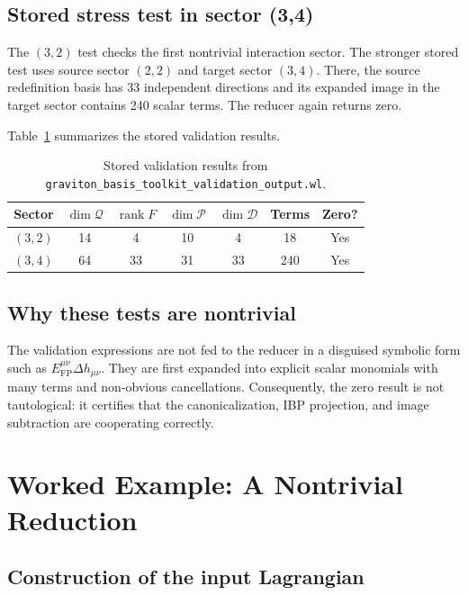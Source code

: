 \documentclass[11pt]{report}
\numberwithin{equation}{chapter}
\newcommand{\validationdata}{\texttt{graviton\_basis\_toolkit\_validation\_output.wl}}
\newcommand{\Rank}{\operatorname{rank}}
\begin{document}
\section{Stored stress test in sector (3,4)}

The \((3,2)\) test checks the first nontrivial interaction sector.
The stronger stored test uses source sector \((2,2)\) and target sector \((3,4)\).
There, the source redefinition basis has 33 independent directions and its expanded image in the target sector contains 240 scalar terms.
The reducer again returns zero.

Table~\ref{tab:validation} summarizes the stored validation results.

\begin{table}[tbp]
\centering
\caption{Stored validation results from \validationdata.}
\label{tab:validation}
{\small
\begin{tabular}{@{}ccccccc@{}}
\toprule
Sector & \(\dim \mathcal{Q}\) & \(\Rank F\) & \(\dim \mathcal{P}\) & \(\dim \mathcal{D}\) & Terms & Zero? \\
\midrule
\((3,2)\) & 14 & 4  & 10 & 4  & 18  & Yes \\
\((3,4)\) & 64 & 33 & 31 & 33 & 240 & Yes \\
\bottomrule
\end{tabular}
}
\end{table}

\section{Why these tests are nontrivial}

The validation expressions are not fed to the reducer in a disguised symbolic form such as \(E_{\mathrm{FP}}^{\mu\nu}\Delta h_{\mu\nu}\).
They are first expanded into explicit scalar monomials with many terms and non-obvious cancellations.
Consequently, the zero result is not tautological:
it certifies that the canonicalization, IBP projection, and image subtraction are cooperating correctly.

\chapter{Worked Example: A Nontrivial Reduction}

\section{Construction of the input Lagrangian}
\end{document}
